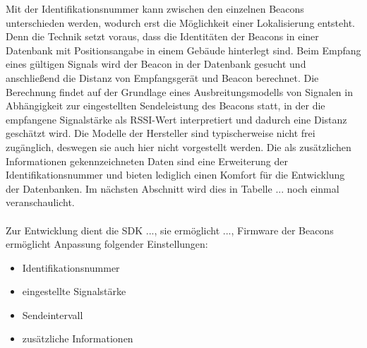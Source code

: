 Mit der Identifikationsnummer kann zwischen den einzelnen Beacons unterschieden werden, wodurch erst die Möglichkeit einer Lokalisierung entsteht. Denn die Technik setzt voraus, dass die Identitäten der Beacons in einer Datenbank mit Positionsangabe in einem Gebäude hinterlegt sind. Beim Empfang eines gültigen Signals wird der Beacon in der Datenbank gesucht und anschließend die Distanz von Empfangsgerät und Beacon berechnet. Die Berechnung findet auf der Grundlage eines Ausbreitungsmodells von Signalen in Abhängigkeit zur eingestellten Sendeleistung des Beacons statt, in der die empfangene Signalstärke als RSSI-Wert interpretiert  und dadurch eine Distanz geschätzt wird. Die Modelle der Hersteller sind typischerweise nicht frei zugänglich, deswegen sie auch hier nicht vorgestellt werden. Die als zusätzlichen Informationen gekennzeichneten Daten sind eine Erweiterung der Identifikationsnummer und bieten lediglich einen Komfort für die Entwicklung der Datenbanken. Im nächsten Abschnitt wird dies in Tabelle ... noch einmal veranschaulicht.\\ \\  

Zur Entwicklung dient die SDK ..., sie ermöglicht ..., Firmware der Beacons ermöglicht Anpassung folgender Einstellungen:
\begin{itemize}
\item Identifikationsnummer
\item eingestellte Signalstärke
\item Sendeintervall
\item zusätzliche Informationen
\end{itemize}

